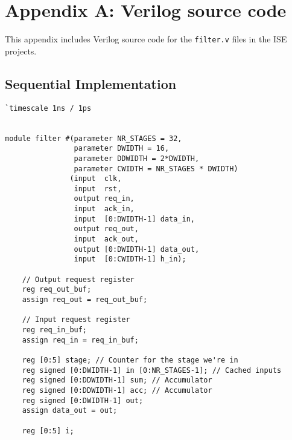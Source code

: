 \section{Appendix A: Verilog source code}
This appendix includes Verilog source code for the \texttt{filter.v} files in the ISE projects.
\subsection{Sequential Implementation}
\label{sec:source1}
\begin{verbatim}
`timescale 1ns / 1ps


module filter #(parameter NR_STAGES = 32,
                parameter DWIDTH = 16,
                parameter DDWIDTH = 2*DWIDTH,
                parameter CWIDTH = NR_STAGES * DWIDTH)
               (input  clk,
                input  rst,
                output req_in,
                input  ack_in,
                input  [0:DWIDTH-1] data_in,
                output req_out,
                input  ack_out,
                output [0:DWIDTH-1] data_out,
                input  [0:CWIDTH-1] h_in);

    // Output request register
    reg req_out_buf;
    assign req_out = req_out_buf;

    // Input request register
    reg req_in_buf;
    assign req_in = req_in_buf;
  
    reg [0:5] stage; // Counter for the stage we're in
    reg signed [0:DWIDTH-1] in [0:NR_STAGES-1]; // Cached inputs
    reg signed [0:DDWIDTH-1] sum; // Accumulator
    reg signed [0:DDWIDTH-1] acc; // Accumulator
    reg signed [0:DWIDTH-1] out;
    assign data_out = out;

    reg [0:5] i;


\end{verbatim}
